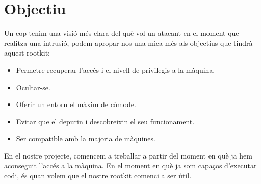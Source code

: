 \section{Objectiu}

Un cop tenim una visió més clara del què vol un atacant en el moment que realitza una intrusió, podem apropar-nos
una mica més als objectius que tindrà aquest rootkit:

\begin{itemize}
    \item Permetre recuperar l'accés i el nivell de privilegis a la màquina.
    \item Ocultar-se.
    \item Oferir un entorn el màxim de còmode.
    \item Evitar que el depurin i descobreixin el seu funcionament.
    \item Ser compatible amb la majoria de màquines.
\end{itemize}

En el nostre projecte, comencem a treballar a partir del moment en què ja hem aconseguit l'accés a la
màquina. En el moment en què ja som capaços d'executar codi, és quan volem que el nostre rootkit 
comenci a ser útil. \\

